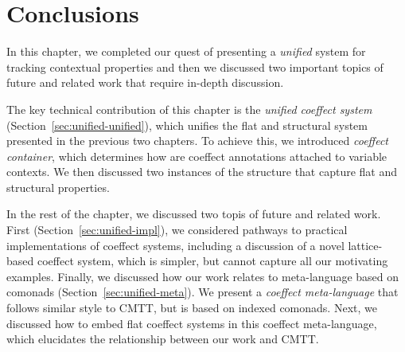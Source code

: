 %                                                                             
%                                                                             

\section{Conclusions}

In this chapter, we completed our quest of presenting a \emph{unified} system for tracking contextual
properties and then we discussed two important topics of future and related work that require 
in-depth discussion.

The key technical contribution of this chapter is the \emph{unified coeffect system} 
(Section~\ref{sec:unified-unified}), which unifies the flat and structural system presented
in the previous two chapters. To achieve this, we introduced \emph{coeffect container}, which
determines how are coeffect annotations attached to variable contexts. We then discussed two
instances of the structure that capture flat and structural properties.

In the rest of the chapter, we discussed two topis of future and related work. First
(Section~\ref{sec:unified-impl}), we considered pathways to practical implementations of
coeffect systems, including a discussion of a novel lattice-based coeffect system, which is simpler,
but cannot capture all our motivating examples. Finally, we discussed how our work relates to 
meta-language based on comonads (Section~\ref{sec:unified-meta}). We present a \emph{coeffect 
meta-language} that follows similar style to CMTT, but is based on indexed comonads. Next, we 
discussed how to embed flat coeffect systems in this coeffect meta-language, which elucidates the 
relationship between our work and CMTT. 